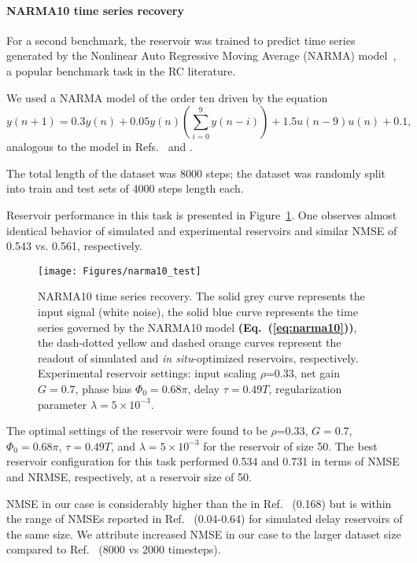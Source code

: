 \documentclass{WileyMSP-template}
\begin{document}
\FloatBarrier

\paragraph{NARMA10 time series recovery}
For a second benchmark, the reservoir was trained to predict time series generated by the Nonlinear Auto Regressive Moving Average (NARMA) model~\cite{ref:rodan2011,ref:paquot2012}, a popular benchmark task in the RC literature.

We used a NARMA model of the order ten driven by the equation
\begin{equation}
  y(n+1)=0.3y(n)+0.05y(n)\left(\sum_{i=0}^{9}y(n-i)\right)+1.5u(n-9)u(n)+0.1,
  \label{eq:narma10}
\end{equation}
analogous to the model in Refs.~\cite{ref:rodan2011,ref:paquot2012} and \cite{ref:hulser2022}.

The total length of the dataset was 8000 steps; the dataset was randomly split into train and test sets of 4000 steps length each.

Reservoir performance in this task is presented in Figure~\ref{fig:narma10}.
One observes almost identical behavior of simulated and experimental reservoirs and similar NMSE of 0.543 vs. 0.561, respectively.

\begin{figure}[htpb]
  \centering
  \texttt{[image: Figures/narma10\_test]}
  \caption{NARMA10 time series recovery. The solid grey curve represents the input signal (white noise), the solid blue curve represents the time series governed by the NARMA10 model \textbf{(Eq.~(\ref{eq:narma10}))}, the dash-dotted yellow and dashed orange curves represent the readout of simulated and \emph{in situ}-optimized reservoirs, respectively. Experimental reservoir settings: input scaling $\rho$=0.33, net gain $G=0.7$, phase bias $\Phi_0=0.68\pi$, delay $\tau=0.49T$, regularization parameter $\lambda=5\times10^{-3}$.}
  \label{fig:narma10}
\end{figure}

The optimal settings of the reservoir were found to be $\rho$=0.33, $G=0.7$, $\Phi_0=0.68\pi$, $\tau=0.49T$, and $\lambda=5\times10^{-3}$ for the reservoir of size 50.
The best reservoir configuration for this task performed 0.534 and 0.731 in terms of NMSE and NRMSE, respectively, at a reservoir size of 50.

NMSE in our case is considerably higher than the in Ref.~\cite{ref:paquot2012} (0.168) but is within the range of NMSEs reported in Ref.~\cite{ref:hulser2022} (0.04-0.64) for simulated delay reservoirs of the same size.
We attribute increased NMSE in our case to the larger dataset size compared to Ref.~\cite{ref:paquot2012} (8000 vs 2000 timesteps).
\end{document}
